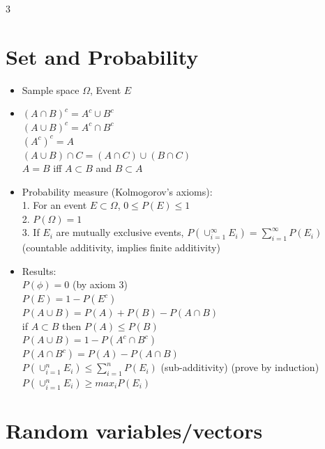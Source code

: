 \documentclass[a4paper,10pt]{article}
\begin{document}
\begin{multicols}{3}
\small


\section*{Set and Probability}

\begin{itemize}
    \item Sample space $\Omega$, Event $E$
    \item
    $(A\cap B)^c=A^c\cup B^c$\\
    $(A\cup B)^c=A^c\cap B^c$\\
    $(A^c)^c=A$\\
    $(A\cup B)\cap C=(A\cap C)\cup (B\cap C)$\\
    $A=B$ iff $A\subset B$ and $B \subset A$
    
    \item Probability measure (Kolmogorov's axioms):\\
    1. For an event $E\subset \Omega$, $0\le P(E)\le 1$ \\
    2. $P(\Omega) =1$\\
    3. If $E_i$ are mutually exclusive events, $P(\cup_{i=1}^\infty E_i)=\sum_{i=1}^\infty P(E_i)$(countable additivity, implies finite additivity)
    \item Results:\\ $P(\phi) =0$ (by axiom 3)\\ 
    $P(E)=1-P(E^c)$\\
    $P(A\cup B)=P(A)+P(B)-P(A\cap B)$ \\
    if $A\subset B$ then $P(A)\le P(B)$\\
    $P(A\cup B)=1-P(A^c\cap B^c)$\\
    $P(A\cap B^c)=P(A)-P(A\cap B)$\\
    $P(\cup_{i=1}^n E_i)\le \sum_{i=1}^nP(E_i)$ (sub-additivity) (prove by induction)\\
    $P(\cup_{i=1}^n E_i)\ge max_i P(E_i)$
\end{itemize}

\section*{Random variables/vectors}


\end{multicols}
\end{document}
